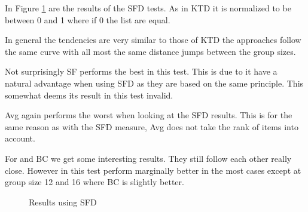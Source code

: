 In Figure \ref{fig:footruledistance} are the results of the SFD tests. As in KTD it is normalized to be between 0 and 1 where if 0 the list are equal.

In general the tendencies are very similar to those of KTD the approaches follow the same curve with all most the same distance jumps between the group sizes.

Not surprisingly SF performs the best in this test. This is due to it have a natural advantage when using SFD as they are based on the same principle. This somewhat deems its result in this test invalid.

Avg again performs the worst when looking at the SFD results. This is for the same reason as with the SFD measure, Avg does not take the rank of items into account.

For \MC and BC we get some interesting results. They still follow each other really close. However in this test \MC perform marginally better in the most cases except at group size 12 and 16 where BC is slightly better.

\begin{figure}[H]
\caption{Results using SFD} \label{fig:footruledistance}
\end{figure}

